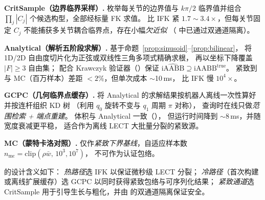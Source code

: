 \documentclass[journal]{IEEEtran}
\newcommand{\iAABB}{\mathrm{iAABB}}
\begin{document}
\textbf{CritSample（边界临界采样）.}
枚举每关节的边界值与 $k\pi/2$ 临界值并组合
$\prod_j |C_j|$ 个候选构型，全部经标量 FK 求值。
比 IFK 紧 $1.7\!\sim\!3.4\times$，但每关节固定 $C_j$
不能捕获多关节耦合临界点，存在小幅\emph{欠近似}
（ 中已通过双通道隔离）。

\textbf{Analytical（解析五阶段求解）.}
基于命题~\ref{prop:sinusoid}--\ref{prop:bilinear}，
将 1D/2D 自由度切片化为正弦或双线性三角多项式精确求根，
再以坐标下降覆盖 $|F|\geq 3$ 自由集；
配合 Krawczyk 验证器（）保证
$\widehat{\iAABB}\supseteq\iAABB^\text{true}$。
紧致到与 MC（百万样本）差距 $<2\%$，但单次成本 $\sim$10\,ms，
比 IFK 慢 $10^4\times$。

\textbf{GCPC（几何临界点缓存）.}
将 Analytical 的求解结果按机器人离线一次性算好并按连杆组织 KD 树
（利用 $q_0$ 旋转不变与 $q_1$ 周期 $\pi$ 对称），
查询时在线只做\emph{范围检索 + 端点重建}。
体积与 Analytical 一致（），
但运行时间降到 $\sim\!8$\,ms，并随宽度衰减更平稳，
适合作为离线 LECT 大批量分裂的紧致源。

\textbf{MC（蒙特卡洛对照）.}
仅作\emph{紧致下界基线}，自适应样本数
$n_\text{mc}=\mathrm{clip}(\rho\bar w,\,10^3,10^7)$，
不可作为认证包络。

\begin{table}[ht]
\centering
\caption{epiAABB 计算管线特性对比（$D=7$，$L_\text{act}=4$）}
\label{tab:epi_compare}
\end{table}

 的设计含义如下：
\emph{热路径}选 IFK 以保证微秒级 LECT 分裂；
\emph{冷路径}（首次构建或离线扩展缓存）选 GCPC 以同时获得紧致包络与可序列化结果；
\emph{紧致通道}选 CritSample 用于引导生长与粗化，并由
 的双通道隔离保证安全。
\end{document}
